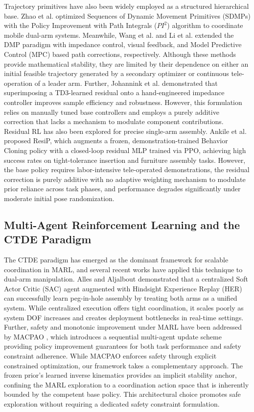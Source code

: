 \documentclass[a4paper,fleqn]{cas-dc}
\begin{document}
Trajectory primitives have also been widely employed as a structured hierarchical base. Zhao et al. \cite{related-40} optimized Sequences of Dynamic Movement Primitives (SDMPs) with the Policy Improvement with Path Integrals ($PI^{2}$) algorithm to coordinate mobile dual-arm systems. Meanwhile, Wang et al. \cite{related-41} and Li et al. \cite{related-42} extended the DMP paradigm with impedance control, visual feedback, and Model Predictive Control (MPC) based path corrections, respectively. Although these methods provide mathematical stability, they are limited by their dependence on either an initial feasible trajectory generated by a secondary optimizer or continuous tele-operation of a leader arm. Further, Johannink et al. \cite{residual} demonstrated that superimposing a TD3-learned residual onto a hand-engineered impedance controller improves sample efficiency and robustness. However, this formulation relies on manually tuned base controllers and employs a purely additive correction that lacks a mechanism to modulate component contributions. Residual RL has also been explored for precise single-arm assembly. Ankile et al. \cite{ResiP} proposed ResiP, which augments a frozen, demonstration-trained Behavior Cloning policy with a closed-loop residual MLP trained via PPO, achieving high success rates on tight-tolerance insertion and furniture assembly tasks. However, the base policy requires labor-intensive tele-operated demonstrations, the residual correction is purely additive with no adaptive weighting mechanism to modulate prior reliance across task phases, and performance degrades significantly under moderate initial pose randomization. 

\subsection{Multi-Agent Reinforcement Learning and the CTDE Paradigm}
The CTDE paradigm has emerged as the dominant framework for scalable coordination in MARL, and several recent works have applied this technique to dual-arm manipulation. Alles and Aljalbout \cite{related-43} demonstrated that a centralized Soft Actor Critic (SAC) agent augmented with Hindsight Experience Replay (HER) can successfully learn peg-in-hole assembly by treating both arms as a unified system. While centralized execution offers tight coordination, it scales poorly as system DOF increases and creates deployment bottlenecks in real-time settings. Further, safety and monotonic improvement under MARL have been addressed by MACPAO \cite{related-44}, which introduces a sequential multi-agent update scheme providing policy improvement guarantees for both task performance and safety constraint adherence. While MACPAO enforces safety through explicit constrained optimization, our framework takes a complementary approach. The frozen prior's learned inverse kinematics provides an implicit stability anchor, confining the MARL exploration to a coordination action space that is inherently bounded by the competent base policy. This architectural choice promotes safe exploration without requiring a dedicated safety constraint formulation.
\end{document}

